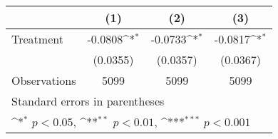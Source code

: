 {
\def\sym#1{\ifmmode^{#1}\else\(^{#1}\)\fi}
\begin{tabular}{l*{3}{c}}
\hline\hline
                    &\multicolumn{1}{c}{(1)}         &\multicolumn{1}{c}{(2)}         &\multicolumn{1}{c}{(3)}         \\
\hline
Treatment           &     -0.0808\sym{*}  &     -0.0733\sym{*}  &     -0.0817\sym{*}  \\
                    &    (0.0355)         &    (0.0357)         &    (0.0367)         \\
\hline
Observations        &        5099         &        5099         &        5099         \\
\hline\hline
\multicolumn{4}{l}{\footnotesize Standard errors in parentheses}\\
\multicolumn{4}{l}{\footnotesize \sym{*} \(p<0.05\), \sym{**} \(p<0.01\), \sym{***} \(p<0.001\)}\\
\end{tabular}
}
